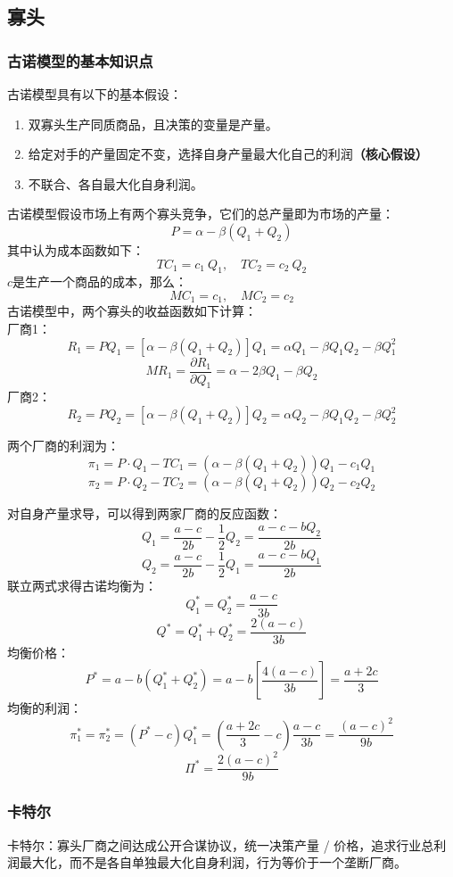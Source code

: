 \documentclass[cn,hazy,blue,14pt,screen]{elegantnote}
\begin{document}
\subsection{寡头}
\subsubsection{古诺模型的基本知识点}

古诺模型具有以下的基本假设：
\begin{enumerate}
    \item 双寡头生产同质商品，且决策的变量是产量。
    \item 给定对手的产量固定不变，选择自身产量最大化自己的利润\textbf{（核心假设）}
    \item 不联合、各自最大化自身利润。
\end{enumerate}

古诺模型假设市场上有两个寡头竞争，它们的总产量即为市场的产量：
$$ P = \alpha - \beta (Q_1 + Q_2)$$
其中认为成本函数如下：
$$ TC_1 = c_1\ Q_1, \quad TC_2 = c_2\ Q_2$$
$c$是生产一个商品的成本，那么：\\
$$ MC_1 = c_1, \quad MC_2 = c_2$$
古诺模型中，两个寡头的收益函数如下计算：\\
厂商1：\\
$$R_1 = PQ_1 = [\alpha - \beta(Q_1+Q_2)]Q_1 = \alpha Q_1 - \beta Q_1 Q_2 - \beta Q_1^2$$
$$MR_1 = \frac{\partial R_1}{\partial Q_1} = \alpha - 2\beta Q_1 - \beta Q_2$$
厂商2：\\
$$R_2 = PQ_2 = [\alpha - \beta(Q_1+Q_2)]Q_2 = \alpha Q_2 - \beta Q_1 Q_2 - \beta Q_2^2$$

两个厂商的利润为：
$$ \pi_1 = P \cdot Q_1 - TC_1 = (\alpha - \beta(Q_1+Q_2))Q_1 - c_1 Q_1$$
$$ \pi_2 = P \cdot Q_2 - TC_2 = (\alpha - \beta(Q_1+Q_2))Q_2 - c_2 Q_2$$

对自身产量求导，可以得到两家厂商的反应函数：
$$Q_1 = \frac{a-c}{2b} - \frac{1}{2}Q_2 = \frac{a-c-bQ_2}{2b}$$
$$Q_2 = \frac{a-c}{2b} - \frac{1}{2}Q_1 = \frac{a-c-bQ_1}{2b}$$
联立两式求得古诺均衡为：
$$Q_1^* = Q_2^* = \frac{a-c}{3b}$$
$$Q^* = Q_1^* + Q_2^* = \frac{2(a-c)}{3b}$$
均衡价格：
$$P^* = a - b(Q_1^* + Q_2^*) = a - b\left[\frac{4(a-c)}{3b}\right] = \frac{a+2c}{3}$$
均衡的利润：
$$\pi_1^* = \pi_2^* = (P^* - c)Q_1^* = \left(\frac{a+2c}{3} - c\right)\frac{a-c}{3b} = \frac{(a-c)^2}{9b}$$
$$\Pi^* = \frac{2(a-c)^2}{9b}$$

\subsubsection{卡特尔}
卡特尔：寡头厂商之间达成公开合谋协议，统一决策产量 / 价格，追求行业总利润最大化，而不是各自单独最大化自身利润，行为等价于一个垄断厂商。
\end{document}

